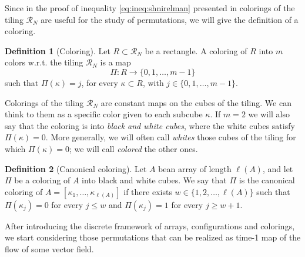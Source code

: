 \documentclass[12 pt]{article}
\theoremstyle{definition} \newtheorem{definition}{Definition}[section]
\theoremstyle{definition} \newtheorem{remark}[definition]{Remark}
\theoremstyle{plain} \newtheorem{lemma}[definition]{Lemma}
\theoremstyle{plain} \newtheorem{proposition}[definition]{Proposition}
\theoremstyle{plain} \newtheorem{theorem}[definition]{Theorem}
\theoremstyle{plain} \newtheorem{corollary}[definition]{Corollary}
\theoremstyle{definition} \newtheorem{example}[definition]{Example}
\theoremstyle{definition} \newtheorem{assumption}[definition]{Assumption}
\theoremstyle{definition} \newtheorem{conjecture}[definition]{Conjecture}
\newcommand{\1}{\mathbbm 1}
\numberwithin{equation}{section}
\begin{document}
Since in the proof of inequality \eqref{eq:ineq:shnirelman} presented in \cite{Shnirelman} colorings of the tiling $\mathcal{R}_N$ are useful for the study of permutations, we will give the definition of a coloring. 

\begin{definition}[Coloring]\label{def:coloring}
    Let $R\subset\mathcal{R}_N$ be a rectangle. A coloring of $R$ into $m$ colors w.r.t. the tiling $\mathcal{R}_N$ is a map 
    \begin{equation*}
        \Pi:R\rightarrow\lbrace{0,1,\dots,m-1}\rbrace
    \end{equation*}
    such that $\Pi(\kappa)=j$, for every $\kappa\subset R$, with $j\in\lbrace 0,1,\dots,m-1\rbrace$.
\end{definition}
Colorings of the tiling $\mathcal{R}_N$ are constant maps on the cubes of the tiling. We can think to them as a specific color given to each subcube $\kappa$.
If $m=2$ we will also say that the coloring is into \emph{black and white cubes}, where the white cubes satisfy $\Pi(\kappa)=0$. More generally, we will often call \emph{whites} those cubes of the tiling for which $\Pi(\kappa)=0$; we will call \emph{colored} the other ones.

\begin{definition}[Canonical coloring]\label{def:canonical:coloring}
    Let $A$ bean array of length $\ell(A)$, and let $\Pi$ be
    a coloring of $A$ into black and white cubes. We say that $\Pi$ is the canonical coloring of $A=[\kappa_1,\dots,\kappa_{\ell(A)}]$ if there exists $w\in\lbrace 1,2,\dots, \ell(A)\rbrace$ such that $\Pi(\kappa_j)=0$ for every $j\leq w$ and $\Pi(\kappa_j)=1$ for every $j\geq w+1$.
\end{definition}

After introducing the discrete framework of arrays, configurations and colorings, we start considering those permutations that can be realized as time-1 map of the flow of some vector field. 
\end{document}
